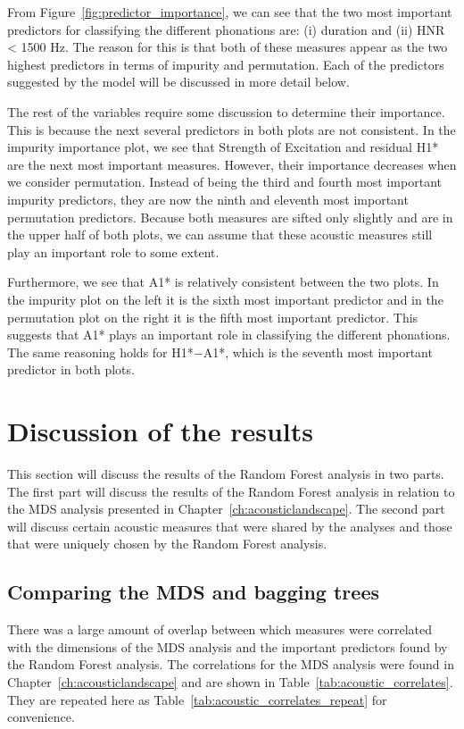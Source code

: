 From Figure~\ref{fig:predictor_importance}, we can see that the two most important predictors for classifying the different phonations are: (i) duration and (ii) HNR < 1500 Hz. The reason for this is that both of these measures appear as the two highest predictors in terms of impurity and permutation. Each of the predictors suggested by the model will be discussed in more detail below. 

The rest of the variables require some discussion to determine their importance. This is because the next several predictors in both plots are not consistent. In the impurity importance plot, we see that Strength of Excitation and residual H1* are the next most important measures. However, their importance decreases when we consider permutation. Instead of being the third and fourth most important impurity predictors, they are now the ninth and eleventh most important permutation predictors. Because both measures are sifted only slightly and are in the upper half of both plots, we can assume that these acoustic measures still play an important role to some extent.

Furthermore, we see that A1* is relatively consistent between the two plots. In the impurity plot on the left it is the sixth most important predictor and in the permutation plot on the right it is the fifth most important predictor. This suggests that A1* plays an important role in classifying the different phonations. The same reasoning holds for H1*$-$A1*, which is the seventh most important predictor in both plots. 

\section{Discussion of the results} \label{sec:dt_discussion}

This section will discuss the results of the Random Forest analysis in two parts. The first part will discuss the results of the Random Forest analysis in relation to the MDS analysis presented in Chapter~\ref{ch:acousticlandscape}. The second part will discuss certain acoustic measures that were shared by the analyses and those that were uniquely chosen by the Random Forest analysis. 
\subsection{Comparing the MDS and bagging trees} \label{sec:dt_mds}
There was a large amount of overlap between which measures were correlated with the dimensions of the MDS analysis and the important predictors found by the Random Forest analysis. The correlations for the MDS analysis were found in Chapter~\ref{ch:acousticlandscape} and are shown in Table~\ref{tab:acoustic_correlates}. They are repeated here as Table~\ref{tab:acoustic_correlates_repeat} for convenience.  

